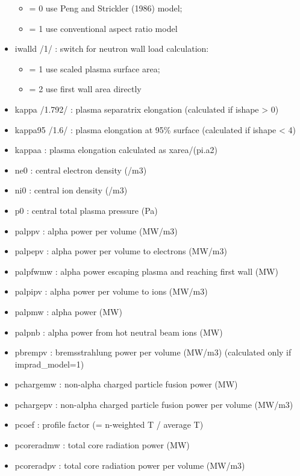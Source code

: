 \documentclass[
]{article}
\providecommand{\tightlist}{%
  \setlength{\itemsep}{0pt}\setlength{\parskip}{0pt}}
\begin{document}
\begin{itemize}
  \begin{itemize}
  \tightlist
  \item
    = 0 use Peng and Strickler (1986) model;
  \item
    = 1 use conventional aspect ratio model
  \end{itemize}
\item
  iwalld /1/ : switch for neutron wall load calculation:

  \begin{itemize}
  \tightlist
  \item
    = 1 use scaled plasma surface area;
  \item
    = 2 use first wall area directly
  \end{itemize}
\item
  kappa /1.792/ : plasma separatrix elongation (calculated if ishape
  \textgreater{} 0)
\item
  kappa95 /1.6/ : plasma elongation at 95\% surface (calculated if
  ishape \textless{} 4)
\item
  kappaa : plasma elongation calculated as xarea/(pi.a2)
\item
  ne0 : central electron density (/m3)
\item
  ni0 : central ion density (/m3)
\item
  p0 : central total plasma pressure (Pa)
\item
  palppv : alpha power per volume (MW/m3)
\item
  palpepv : alpha power per volume to electrons (MW/m3)
\item
  palpfwmw : alpha power escaping plasma and reaching first wall (MW)
\item
  palpipv : alpha power per volume to ions (MW/m3)
\item
  palpmw : alpha power (MW)
\item
  palpnb : alpha power from hot neutral beam ions (MW)
\item
  pbrempv : bremsstrahlung power per volume (MW/m3) (calculated only if
  imprad\_model=1)
\item
  pchargemw : non-alpha charged particle fusion power (MW)
\item
  pchargepv : non-alpha charged particle fusion power per volume (MW/m3)
\item
  pcoef : profile factor (= n-weighted T / average T)
\item
  pcoreradmw : total core radiation power (MW)
\item
  pcoreradpv : total core radiation power per volume (MW/m3)

\end{itemize}
\end{document}
